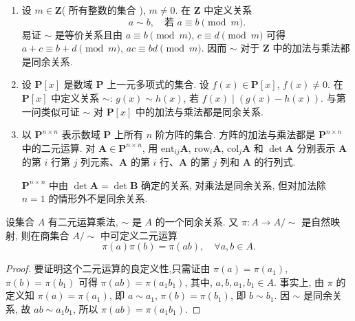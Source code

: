 \documentclass[../../main.tex]{subfiles}
\begin{document}
\begin{example}
\begin{enumerate}
\item 设 \( m \in \mathbf{Z} \)( 所有整数的集合 ), \( m \neq 0 \). 在 \( \mathbf{Z} \) 中定义关系
\[
a \sim b, \quad \text{若 } a \equiv b \pmod{m}.
\]
易证 \( \sim \) 是等价关系且由 \( a \equiv b \pmod{m} \), \( c \equiv d \pmod{m} \) 可得 \( a + c \equiv b + d \pmod{m} \), \( ac \equiv bd \pmod{m} \). 因而 \( \sim \) 对于 \( \mathbf{Z} \) 中的加法与乘法都是同余关系.

\item 设 \( \mathbf{P}[x] \) 是数域 \( \mathbf{P} \) 上一元多项式的集合. 设 \( f(x) \in \mathbf{P}[x] \), \( f(x) \neq 0 \). 在 \( \mathbf{P}[x] \) 中定义关系 \( \sim \): \( g(x) \sim h(x) \), 若 \( f(x) \mid (g(x) - h(x)) \). 与第一问类似可证 \( \sim \) 对 \( \mathbf{P}[x] \) 中的加法与乘法都是同余关系.

\item 以 \( \mathbf{P}^{n \times n} \) 表示数域 \( \mathbf{P} \) 上所有 \( n \) 阶方阵的集合. 方阵的加法与乘法都是 \( \mathbf{P}^{n \times n} \) 中的二元运算. 对 \( \boldsymbol{A} \in \mathbf{P}^{n \times n} \), 用 \( \text{ent}_{ij}\boldsymbol{A} \), \( \text{row}_i\boldsymbol{A} \), \( \text{col}_j\boldsymbol{A} \) 和 \( \det\boldsymbol{A} \) 分别表示 \( \boldsymbol{A} \) 的第 \( i \) 行第 \( j \) 列元素、\( \boldsymbol{A} \) 的第 \( i \) 行、\( \boldsymbol{A} \) 的第 \( j \) 列和 \( \boldsymbol{A} \) 的行列式.

\( \mathbf{P}^{n \times n} \) 中由 \( \det\boldsymbol{A} = \det\boldsymbol{B} \) 确定的关系, 对乘法是同余关系, 但对加法除 \( n = 1 \) 的情形外不是同余关系.
\end{enumerate}
\end{example}

\begin{theorem}\label{theorem:同余关系诱导商集中的乘法-定理1.1.3}
设集合 \( A \) 有二元运算乘法, \( \sim \) 是 \( A \) 的一个同余关系. 又 \( \pi: A \to A/\sim \) 是自然映射, 则在商集合 \( A/\sim \) 中可定义二元运算
\[
\pi(a)\pi(b) = \pi(ab),\quad \forall a,b \in A .
\]
\end{theorem}
\begin{proof}
要证明这个二元运算的良定义性,只需证由 \( \pi(a) = \pi(a_1) \), \( \pi(b) = \pi(b_1) \) 可得 \( \pi(ab) = \pi(a_1b_1) \), 其中, \( a,b,a_1, b_1 \in A \). 事实上, 由 \( \pi \) 的定义知 \( \pi(a) = \pi(a_1) \), 即 \( a \sim a_1 \), \( \pi(b) = \pi(b_1) \), 即 \( b \sim b_1 \). 因 \( \sim \) 是同余关系, 故 \( ab \sim a_1b_1 \), 所以 \( \pi(ab) = \pi(a_1b_1) \).

\end{proof}
\end{document}
